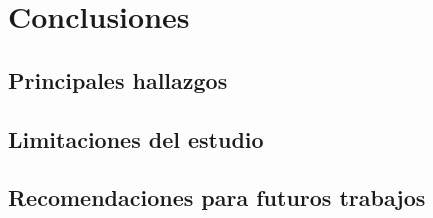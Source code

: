 \chapter{Conclusiones}
\thispagestyle{fancy}


\section{Principales hallazgos}

\section{Limitaciones del estudio}

\section{Recomendaciones para futuros trabajos}